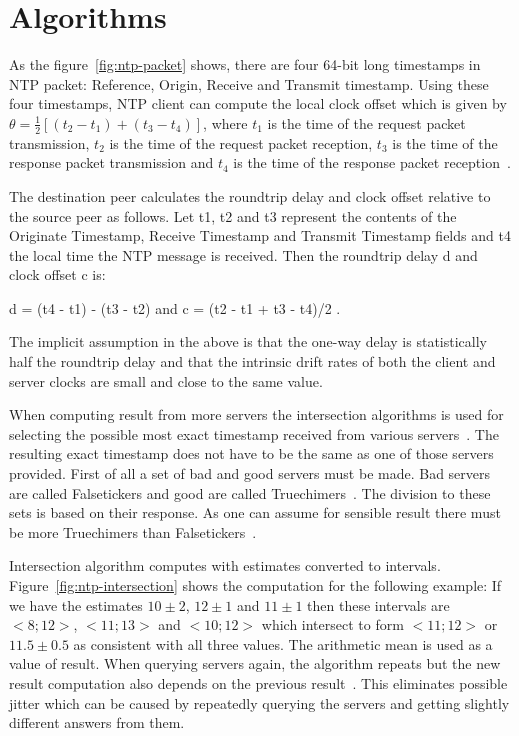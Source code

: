 
\section{Algorithms}
As the figure~\ref{fig:ntp-packet} shows, there are four 64-bit long timestamps
in NTP packet: Reference, Origin, Receive and Transmit timestamp.
Using these four timestamps, NTP client can compute
the local clock offset which is given by $\theta = \frac{1}{2}[(t_2 - t_1) + (t_3 - t_4)]$,
where $t_1$ is the time of the request packet transmission,
$t_2$ is the time of the request packet reception,
$t_3$ is the time of the response packet transmission and
$t_4$ is the time of the response packet reception~\cite{ntp-algor,rfc5905}.

The destination peer calculates the roundtrip delay and clock
      offset relative to the source peer as follows.  Let t1, t2 and t3
      represent the contents of the Originate Timestamp, Receive
      Timestamp and Transmit Timestamp fields and t4 the local time the
      NTP message is received.  Then the roundtrip delay d and clock
      offset c is:

         d = (t4 - t1) - (t3 - t2)  and  c = (t2 - t1 + t3 - t4)/2 .

      The implicit assumption in the above is that the one-way delay is
      statistically half the roundtrip delay and that the intrinsic
      drift rates of both the client and server clocks are small and
      close to the same value.

When computing result from more servers the intersection algorithms is used
for selecting the possible most exact timestamp received from various servers~\cite{rfc5905}.
The resulting exact timestamp does not have to be the same
as one of those servers provided.
First of all a set of bad and good servers must be made.
Bad servers are called Falsetickers and good are called Truechimers~\cite{rfc5905}.
The division to these sets is based on their response.
As one can assume for sensible result there must be more Truechimers than Falsetickers~\cite{rfc5905}.

Intersection algorithm computes with estimates converted to intervals.
Figure~\ref{fig:ntp-intersection} shows the computation for the following example:
If we have the estimates $10 \pm 2$, $12 \pm 1$ and $11 \pm 1$
then these intervals are $<8; 12>$, $<11; 13>$ and $<10; 12>$ which
intersect to form $<11; 12>$ or $11.5 \pm 0.5$ as consistent with all three values.
The arithmetic mean is used as a value of result.
When querying servers again, the algorithm repeats but the new result computation
also depends on the previous result~\cite{rfc5905}.
This eliminates possible jitter which can be caused by repeatedly querying the servers
and getting slightly different answers from them.

